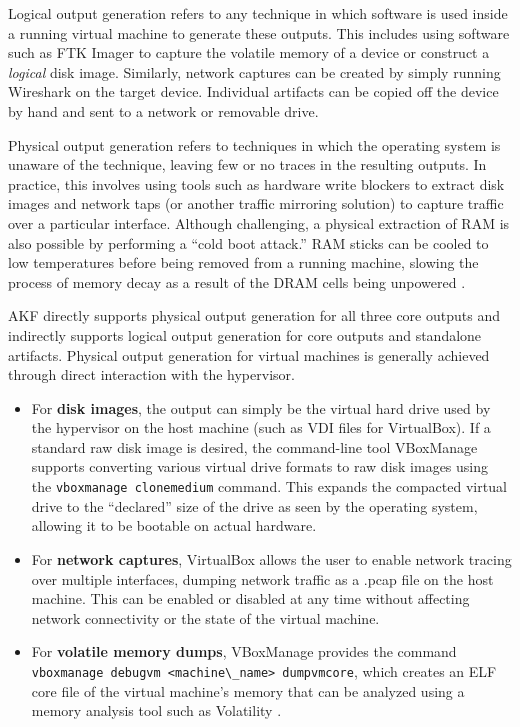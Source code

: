 \documentclass[letterpaper,12pt]{report}
\def\tightlist{}
\newcommand{\passthrough}[1]{#1}
\begin{document}
Logical output generation refers to any technique in which software is
used inside a running virtual machine to generate these outputs. This
includes using software such as FTK Imager
\cite{exterroFTKImagerForensic} to capture the volatile memory of a
device or construct a \emph{logical} disk image. Similarly, network
captures can be created by simply running Wireshark on the target
device. Individual artifacts can be copied off the device by hand and
sent to a network or removable drive.

Physical output generation refers to techniques in which the operating
system is unaware of the technique, leaving few or no traces in the
resulting outputs. In practice, this involves using tools such as
hardware write blockers to extract disk images and network taps (or
another traffic mirroring solution) to capture traffic over a particular
interface. Although challenging, a physical extraction of RAM is also
possible by performing a ``cold boot attack.'' RAM sticks can be cooled
to low temperatures before being removed from a running machine, slowing
the process of memory decay as a result of the DRAM cells being
unpowered \cite{yitbarekColdBootAttacks2017}.

AKF directly supports physical output generation for all three core
outputs and indirectly supports logical output generation for core
outputs and standalone artifacts. Physical output generation for virtual
machines is generally achieved through direct interaction with the
hypervisor.

\begin{itemize}
\tightlist
\item
  For \textbf{disk images}, the output can simply be the virtual hard
  drive used by the hypervisor on the host machine (such as VDI files
  for VirtualBox). If a standard raw disk image is desired, the
  command-line tool VBoxManage supports converting various virtual drive
  formats to raw disk images using the
  \passthrough{\lstinline!vboxmanage clonemedium!} command. This expands
  the compacted virtual drive to the ``declared'' size of the drive as
  seen by the operating system, allowing it to be bootable on actual
  hardware.
\item
  For \textbf{network captures}, VirtualBox allows the user to enable
  network tracing over multiple interfaces, dumping network traffic as a
  .pcap file on the host machine. This can be enabled or disabled at any
  time without affecting network connectivity or the state of the
  virtual machine.
\item
  For \textbf{volatile memory dumps}, VBoxManage provides the command
  \passthrough{\lstinline!vboxmanage debugvm <machine\_name> dumpvmcore!},
  which creates an ELF core file of the virtual machine's memory that
  can be analyzed using a memory analysis tool such as Volatility
  \cite{volatilityfoundationVolatility32025}.
\end{itemize}
\end{document}
